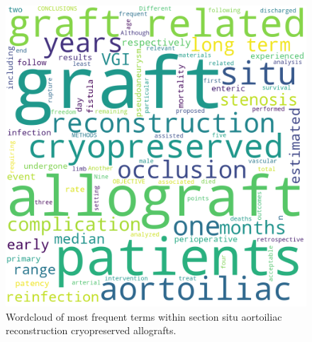 \documentclass{qqtarticle}
\begin{document}
        \begin{figure}[H]
            \centering
            \includegraphics[width=.75\linewidth]{img/situaortoiliacreconstructioncryopreservedallografts.png}
            \caption{Wordcloud of most frequent terms within section situ aortoiliac reconstruction cryopreserved allografts.}
            \label{fig:wcl_situaortoiliacreconstructioncryopreservedallografts}
        \end{figure}
\end{document}
